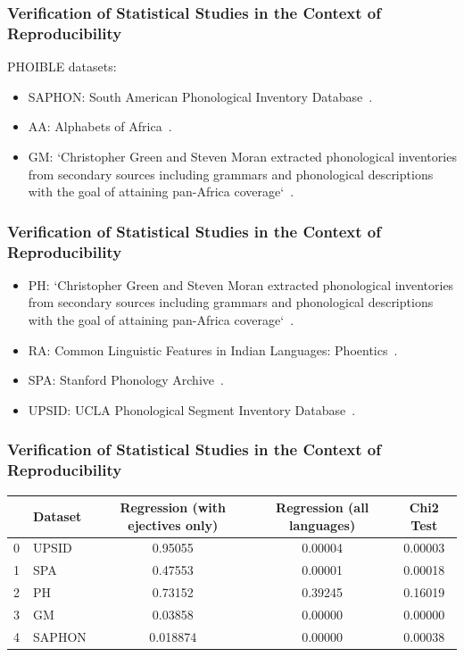 \documentclass{beamer}
\begin{document}
\begin{frame}
\frametitle{Verification of Statistical Studies in the Context of Reproducibility}
PHOIBLE datasets:
\begin{itemize}
 \item SAPHON: South American Phonological Inventory Database~\parencite{saphon}.
 \item AA: Alphabets of Africa~\parencite{aa}.
 \item GM: `Christopher Green and Steven Moran extracted phonological inventories from secondary sources including grammars and phonological descriptions with the goal of attaining pan-Africa coverage`~\parencite{gm}.
\end{itemize}
\end{frame}

\begin{frame}
\frametitle{Verification of Statistical Studies in the Context of Reproducibility}
\begin{itemize}
 \item PH: `Christopher Green and Steven Moran extracted phonological inventories from secondary sources including grammars and phonological descriptions with the goal of attaining pan-Africa coverage`~\parencite{gm}.
 \item RA: Common Linguistic Features in Indian Languages: Phoentics~\parencite{ra}.
 \item SPA: Stanford Phonology Archive~\parencite{spa}.
 \item UPSID: UCLA Phonological Segment Inventory Database~\parencite{upsid}.
\end{itemize}
\end{frame}

\begin{frame}
\frametitle{Verification of Statistical Studies in the Context of Reproducibility}
\begin{adjustbox}{max width=\textwidth}
\begin{tabular}{l|l|ccc}
    \toprule
    ~  & Dataset  & Regression (with ejectives only)  & Regression (all languages)  & Chi2 Test \\
    \midrule
    0  & UPSID  & 0.95055  & 0.00004  & 0.00003 \\
    1  & SPA  & 0.47553  & 0.00001  & 0.00018 \\
    2  & PH  & 0.73152  & 0.39245  & 0.16019 \\
    3  & GM  & 0.03858  & 0.00000  & 0.00000 \\
    4  & SAPHON  & 0.018874  & 0.00000  & 0.00038 \\
    \bottomrule
\end{tabular}
\end{adjustbox}
\end{frame}
\end{document}
